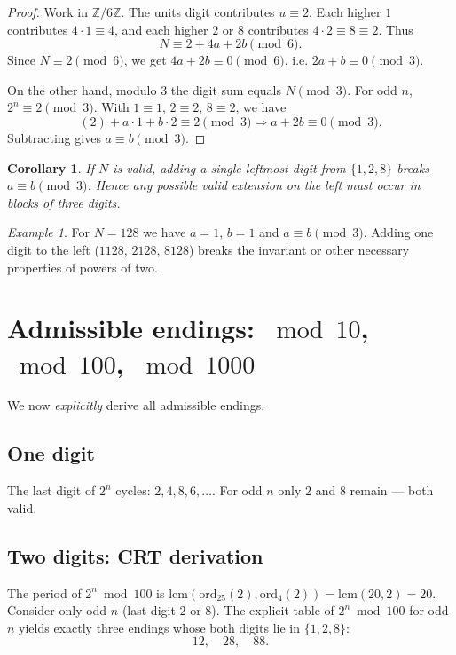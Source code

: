 \documentclass[12pt]{article}
\theoremstyle{plain}
\newtheorem{corollary}{Corollary}
\theoremstyle{remark}
\newtheorem*{example}{Example}
\begin{document}
\begin{proof}
Work in $\mathbb Z/6\mathbb Z$. The units digit contributes $u\equiv2$. Each higher $1$ contributes $4\cdot1\equiv4$, and each higher $2$ or $8$ contributes $4\cdot2\equiv8\equiv2$. Thus
\[
N\equiv 2 + 4a + 2b \pmod6.
\]
Since $N\equiv2\pmod6$, we get $4a+2b\equiv0\pmod6$, i.e. $2a+b\equiv0\pmod3$.

On the other hand, modulo $3$ the digit sum equals $N\pmod3$. For odd $n$, $2^n\equiv2\pmod3$. With $1\equiv1$, $2\equiv2$, $8\equiv2$, we have
\[
(2)+a\cdot1+b\cdot2\equiv2\pmod3 \Rightarrow a+2b\equiv0\pmod3.
\]
Subtracting gives $a\equiv b\pmod3$.
\end{proof}

\begin{corollary}\label{cor:blocks}
If $N$ is valid, adding a single leftmost digit from $\{1,2,8\}$ breaks $a\equiv b\pmod3$. Hence any possible valid extension on the left must occur in blocks of three digits.
\end{corollary}

\begin{example}
For $N=128$ we have $a=1$, $b=1$ and $a\equiv b\pmod3$. Adding one digit to the left ($1128$, $2128$, $8128$) breaks the invariant or other necessary properties of powers of two.
\end{example}

\section{Admissible endings: \texorpdfstring{$\bmod 10$}{mod 10}, \texorpdfstring{$\bmod 100$}{mod 100}, \texorpdfstring{$\bmod 1000$}{mod 1000}}
We now \emph{explicitly} derive all admissible endings.

\subsection*{One digit}
The last digit of $2^n$ cycles: $2,4,8,6,\ldots$. For odd $n$ only $2$ and $8$ remain — both valid.

\subsection*{Two digits: CRT derivation}
The period of $2^n\bmod100$ is $\mathrm{lcm}(\mathrm{ord}_{25}(2),\mathrm{ord}_{4}(2))=\mathrm{lcm}(20,2)=20$. Consider only odd $n$ (last digit $2$ or $8$). The explicit table of $2^n\bmod100$ for odd $n$ yields exactly three endings whose both digits lie in $\{1,2,8\}$:
\begin{equation}\label{eq:tails2}
\boxed{12,\quad 28,\quad 88.}
\end{equation}
\end{document}
